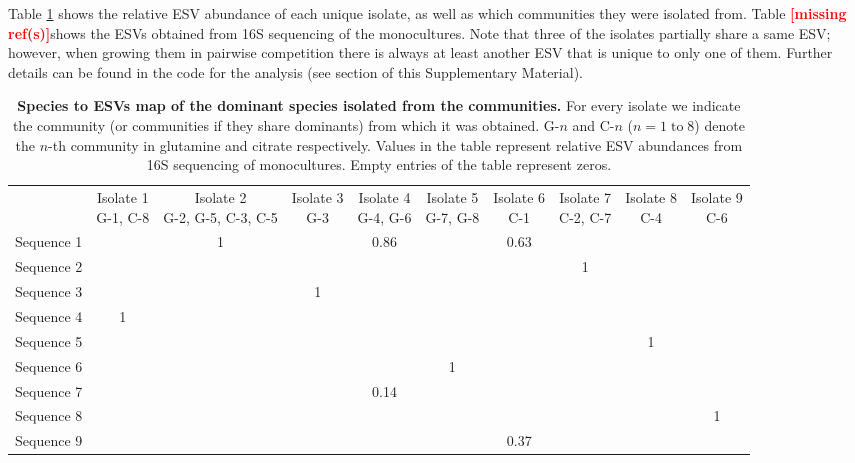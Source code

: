 \documentclass[a4paper,10pt]{article}
\newcommand{\mr}{\textcolor{red}{\textbf{[missing ref(s)]}}}
\begin{document}
Table \ref{supp-tab:isolates} shows the relative ESV abundance of each unique
isolate, as well as which communities they were isolated from.
Table \mr shows the ESVs obtained from 16S sequencing
of the monocultures. Note that three of the isolates partially share a same
ESV; however, when growing them in pairwise competition there is always at least
another ESV that is unique to only one of them.
Further details can be found in the code for the analysis (see section 
 of this Supplementary Material).

\begin{table}
\scriptsize
\centering
{}

\begin{tabular}{lccccccccc}
 & \makecell{Isolate 1 \\ G-1, C-8} 
 & \makecell{Isolate 2 \\ G-2, G-5, C-3, C-5 }
 & \makecell{Isolate 3 \\ G-3 }
 & \makecell{Isolate 4 \\ G-4, G-6 }
 & \makecell{Isolate 5 \\ G-7, G-8 }
 & \makecell{Isolate 6 \\ C-1 }
 & \makecell{Isolate 7 \\ C-2, C-7 }
 & \makecell{Isolate 8 \\ C-4 }
 & \makecell{Isolate 9 \\ C-6 } \\ \cline{2-10} 
\multicolumn{1}{l|}{Sequence 1} &  & 1 &  & 0.86 &  & 0.63 &  &  &  \\
\multicolumn{1}{l|}{Sequence 2} &  &  &  &  &  &  & 1 &  &  \\
\multicolumn{1}{l|}{Sequence 3} &  &  & 1 &  &  &  &  &  &  \\
\multicolumn{1}{l|}{Sequence 4} & 1 &  &  &  &  &  &  &  &  \\
\multicolumn{1}{l|}{Sequence 5} &  &  &  &  &  &  &  & 1 &  \\
\multicolumn{1}{l|}{Sequence 6} &  &  &  &  & 1 &  &  &  &  \\
\multicolumn{1}{l|}{Sequence 7} &  &  &  & 0.14 &  &  &  &  &  \\
\multicolumn{1}{l|}{Sequence 8} &  &  &  &  &  &  &  &  & 1 \\
\multicolumn{1}{l|}{Sequence 9} &  &  &  &  &  & 0.37 &  &  &
\end{tabular}

\caption{\textbf{Species to ESVs map of the dominant species isolated from
the communities.} For every isolate we indicate the community (or communities if
they share dominants) from which it was obtained. G-$n$ and C-$n$
($n=1 \; \text{to} \; 8$)
denote the $n$-th community in glutamine and citrate respectively.
Values in the table represent relative ESV abundances from 16S sequencing
of monocultures.
Empty entries of the table represent zeros.}
\label{supp-tab:isolates}

\end{table}
\end{document}
